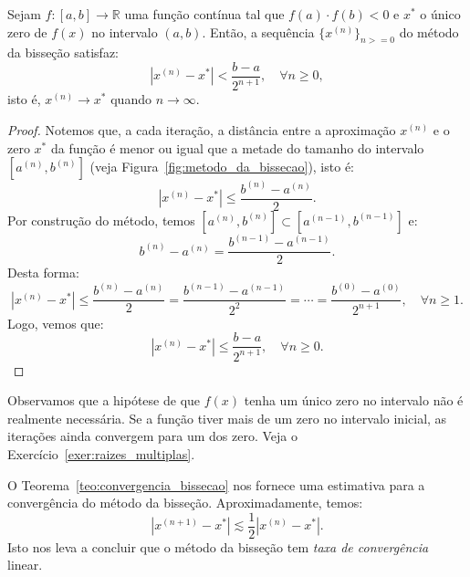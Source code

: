 \begin{teo}\label{teo:convergencia_bissecao} Sejam $f:[a, b]\to \mathbb{R}$ uma função contínua tal que $f(a)\cdot f(b) < 0$ e $x^*$ o único zero de $f(x)$ no intervalo $(a, b)$. Então, a sequência $\{x^{(n)}\}_{n>=0}$ do método da bisseção satisfaz:
  \begin{equation*}
    |x^{(n)} - x^{*}| < \frac{b - a}{2^{n+1}},\quad\forall n\geq 0,
  \end{equation*}
isto é, $x^{(n)}\to x^*$ quando $n\to\infty$.
\end{teo}
\begin{proof}
 Notemos que, a cada iteração, a distância entre a aproximação $x^{(n)}$ e o zero $x^*$ da função é menor ou igual que a metade do tamanho do intervalo $[a^{(n)}, b^{(n)}]$ (veja Figura~\ref{fig:metodo_da_bissecao}), isto é:
\begin{equation*}
  |x^{(n)}-x^*| \leq \frac{b^{(n)}-a^{(n)}}{2}.
\end{equation*}
Por construção do método, temos $[a^{(n)}, b^{(n)}]\subset [a^{(n-1)}, b^{(n-1)}]$ e:
\begin{equation*}
  b^{(n)} - a^{(n)} = \frac{b^{(n-1)}-a^{(n-1)}}{2}.
\end{equation*}
Desta forma:
\begin{equation*}
  |x^{(n)}-x^*|  \leq \frac{b^{(n)}-a^{(n)}}{2} = \frac{b^{(n-1)}-a^{(n-1)}}{2^2} = \cdots = \frac{b^{(0)}-a^{(0)}}{2^{n+1}},\quad \forall n\geq 1.
\end{equation*}
Logo, vemos que:
\begin{equation*}
  |x^{(n)}-x^*|  \leq \frac{b-a}{2^{n+1}},\quad \forall n\geq 0.
\end{equation*} 
\end{proof}

Observamos que a hipótese de que $f(x)$ tenha um único zero no intervalo não é realmente necessária. Se a função tiver mais de um zero no intervalo inicial, as iterações ainda convergem para um dos zero. Veja o Exercício~\ref{exer:raizes_multiplas}.

\begin{obs}
  O Teorema~\ref{teo:convergencia_bissecao} nos fornece uma estimativa para a convergência do método da bisseção. Aproximadamente, temos:
  \begin{equation*}
    |x^{(n+1)} - x^*| \lesssim \frac{1}{2}|x^{(n)} - x^*|.
  \end{equation*}
Isto nos leva a concluir que o método da bisseção tem \emph{taxa de convergência} linear.
\end{obs}

